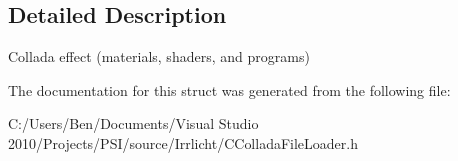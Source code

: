 \subsection{Detailed Description}
Collada effect (materials, shaders, and programs) 

The documentation for this struct was generated from the following file\-:\begin{DoxyCompactItemize}
\item 
C\-:/\-Users/\-Ben/\-Documents/\-Visual Studio 2010/\-Projects/\-P\-S\-I/source/\-Irrlicht/C\-Collada\-File\-Loader.\-h\end{DoxyCompactItemize}
